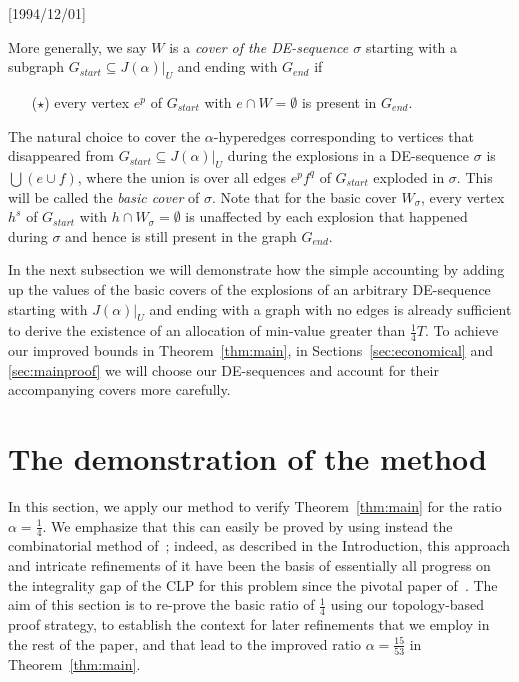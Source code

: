 \NeedsTeXFormat{LaTeX2e}[1994/12/01]\documentclass[letterpaper, 11pt]{article}
\theoremstyle{definition}
\theoremstyle{remark}
\numberwithin{equation}{section}
\begin{document}
More generally, we say $W$ is a {\em cover of the DE-sequence $\sigma$}
starting with a subgraph $G_{start} \subseteq J(\alpha)|_U$ and
ending with $G_{end}$ if 
\begin{itemize}
\item[($\star$)]  every vertex $e^p$ of
$G_{start}$ with $e\cap W = \emptyset$ is present in $G_{end}$.
\end{itemize}
The natural choice to cover the $\alpha$-hyperedges corresponding
to vertices that disappeared from $G_{start} \subseteq J(\alpha)|_U$ 
during the explosions in a DE-sequence $\sigma$ is $\bigcup (e\cup f)$,
where the union is over all edges $e^pf^q$ of $G_{start}$
exploded in $\sigma$. This will be called the {\em basic cover} of
$\sigma$. Note that for the basic cover $W_{\sigma}$,
every vertex $h^s$ of $G_{start}$ with $h\cap W_{\sigma} =
\emptyset$ is unaffected by each explosion that happened during
$\sigma$ and hence is still present in the graph $G_{end}$.


In the next subsection we will demonstrate how the simple accounting
by adding up the values of the basic covers of the explosions of an
arbitrary DE-sequence starting with $J(\alpha)|_U$ and ending with a
graph with no edges
is already sufficient to derive the existence of an allocation of
min-value greater than  $\frac{1}{4}T$.
To achieve our improved bounds in Theorem~\ref{thm:main}, in Sections~\ref{sec:economical} and
\ref{sec:mainproof} we will choose our DE-sequences
and account for their accompanying covers more carefully.



\section{The demonstration of the method} \label{sec:warmup}

In this section, we apply our method to verify
Theorem~\ref{thm:main} for the ratio $\alpha=\frac{1}{4}$. We emphasize that
this can easily be proved by using instead the combinatorial method
of~\cite{haxell}; indeed, as described in the Introduction, this approach
and intricate refinements of it
have been the basis of essentially all progress on the integrality gap
of the CLP for this problem since the pivotal paper
of~\cite{asadpourfeigesaberi}. 
The aim of this section is to re-prove the basic ratio of
$\frac{1}{4}$ using our topology-based proof strategy, to establish the
context for later refinements that we employ in the rest of the paper, and that lead to
the improved ratio $\alpha=\frac{15}{53}$ in Theorem~\ref{thm:main}.
\end{document}
